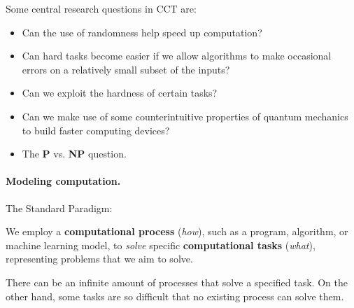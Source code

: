 \documentclass{article}
\begin{document}
			Some central research questions in CCT are:
			\vspace{-0.1cm}
			\begin{itemize}
				\item Can the use of randomness help speed up computation?
				\vspace{-0.25cm}
				\item Can hard tasks become easier if we allow algorithms to make occasional errors on a relatively small subset of the inputs?
				\vspace{-0.25cm}
				\item Can we exploit the hardness of certain tasks?
				\vspace{-0.25cm}
				\item Can we make use of some counterintuitive properties of quantum mechanics to build faster computing devices?
				\vspace{-0.25cm}
				\item The \textbf{P} vs. \textbf{NP} question.
			\end{itemize}
			\newpage
			\paragraph{\large Modeling computation.}
			\mbox{}
			\vspace{0.1cm}
			
			The Standard Paradigm:
			\begin{center}
    			\vspace{0.15cm}
			\end{center}
			We employ a \textbf{computational process} (\textit{how}), such as a program, algorithm, or machine learning model, to \textit{solve} specific \textbf{computational tasks} (\textit{what}), representing problems that we aim to solve.
			\vspace{0.1cm}
			
			There can be an infinite amount of processes that solve a specified task. On the other hand, some tasks are so difficult that no existing process can solve them.
			\vspace{0.1cm}
			
\end{document}
